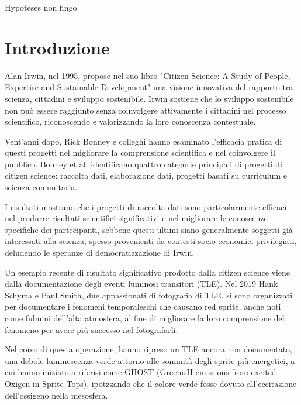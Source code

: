 \documentclass[12pt,a4paper]{report}
\begin{document}
\vspace*{\fill}
\begin{flushright}
    Hypoteses non fingo
\end{flushright}
\vspace*{\fill}
\newpage

\tableofcontents
\newpage

\chapter*{Introduzione}

Alan Irwin, nel 1995, propose nel suo libro "Citizen Science: A Study of People, Expertise and Sustainable Development" \cite{irwin1995citizen} una visione innovativa del rapporto tra scienza, cittadini e sviluppo sostenibile. Irwin sostiene che lo sviluppo sostenibile non può essere raggiunto senza coinvolgere attivamente i cittadini nel processo scientifico, riconoscendo e valorizzando la loro conoscenza contestuale. 

Vent'anni dopo, Rick Bonney e colleghi \cite{bonney2015} hanno esaminato l'efficacia pratica di questi progetti nel migliorare la comprensione scientifica e nel coinvolgere il pubblico. Bonney et al. identificano quattro categorie principali di progetti di citizen science: raccolta dati, elaborazione dati, progetti basati su curriculum e scienza comunitaria.

I risultati mostrano che i progetti di raccolta dati sono particolarmente efficaci nel produrre risultati scientifici significativi e nel migliorare le conoscenze specifiche dei partecipanti, sebbene questi ultimi siano generalmente soggetti già interessati alla scienza, spesso provenienti da contesti socio-economici privilegiati, deludendo le speranze di democratizzazione di Irwin.

Un esempio recente di risultato significativo prodotto dalla citizen science viene dalla documentazione degli eventi luminosi transitori (TLE). Nel 2019 Hank Schyma e Paul Smith, due appassionati di fotografia di TLE, si sono organizzati per documentare i fenomeni temporaleschi che causano red sprite, anche noti come fulmini dell'alta atmosfera, al fine di migliorare la loro comprensione del fenomeno per avere più successo nel fotografarli.

Nel corso di questa operazione, hanno ripreso un TLE ancora non documentato, una debole luminescenza verde attorno alle sommità degli sprite più energetici, a cui hanno iniziato a riferisi come GHOST (GreenisH emissions from excited Oxigen in Sprite Tops), ipotzzando che il colore verde fosse dovuto all'eccitazione dell'ossigeno nella mesosfera\cite{tle_documentario}. 
\end{document}
